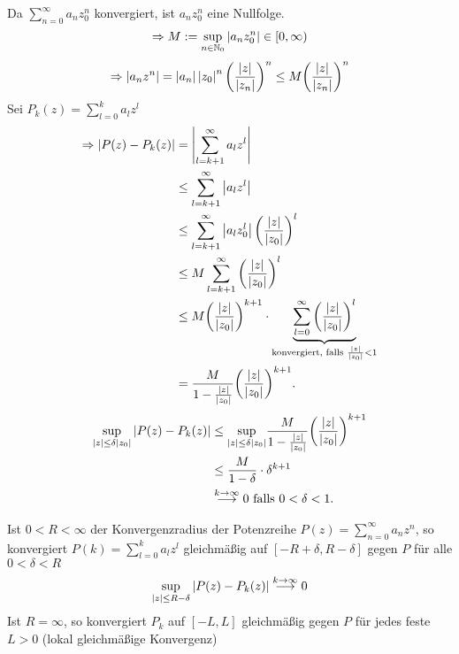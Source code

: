 \documentclass[../ana1.tex]{subfiles}
\begin{document}
\begin{bew}
    Da \( \sum_{n=0}^\infty a_n z_0^n \) konvergiert, ist 
    \( a_n z_0^n \) eine Nullfolge.
    \[ \Rightarrow M := \underset{n\in\mathbb{N}_0}{\sup} 
    \left|a_n z_0^n\right| \in [0,\infty) \]
    \[ \Rightarrow \left|a_n z^n\right| = \left|a_n\right| \left|z_0\right|^n 
    {\left(\frac{\left|z\right|}{\left|z_n\right|}\right)}^n 
    \leq M {\left(\frac{\left|z\right|}{\left|z_n\right|}\right)}^n \]
    Sei \( P_k(z) = \sum_{l=0}^k a_l z^l \)
    \begin{align*}
        \Rightarrow \left| P(z) - P_k(z) \right| 
        &= \left| \sum_{l=k+1}^\infty a_l z^l \right| \\
        &\leq \sum_{l=k+1}^\infty \left|a_l z^l\right| \\
        &\leq \sum_{l=k+1}^\infty \left| a_l z_0^l \right| 
        {\left( \frac{\left|z\right|}{\left|z_0\right|} \right)}^l \\
        &\leq M \sum_{l=k+1}^\infty 
        {\left( \frac{\left|z\right|}{\left|z_0\right|} \right)}^l \\
        &\leq M {\left( \frac{\left|z\right|}{\left|z_0\right|} \right)}^{k+1} 
        \cdot \underbrace{\sum_{l=0}^\infty 
        {\left( \frac{\left|z\right|}{\left|z_0\right|} \right)}^l}_{
            \text{konvergiert, falls } \frac{\left|z\right|}{\left|z_0\right|} < 1
        }\\
        &= \frac{ M }{ 1-\frac{\left|z\right|}{\left|z_0\right|} } 
        {\left( \frac{\left|z\right|}{\left|z_0\right|} \right)}^{k+1}.
    \end{align*}
    \begin{align*}
        \underset{\left|z\right| \leq \delta \left|z_0\right|}{\sup} 
        \left|P(z) - P_k(z)\right| 
        &\leq \underset{\left|z\right| \leq \delta \left|z_0\right|}{\sup} 
        \frac{ M }{ 1 - \frac{\left|z\right|}{\left|z_0\right|} } 
        {\left( \frac{\left|z\right|}{\left|z_0\right|} \right)}^{k+1}\\
        &\leq \frac{M}{1-\delta} \cdot \delta^{k+1}\\
        &\overset{k\rightarrow\infty}{\longrightarrow} 0 
        \text{ falls } 0 < \delta < 1.
    \end{align*}
\end{bew}
\begin{bem}
    Ist \(0 < R < \infty \) der Konvergenzradius der Potenzreihe 
    \(P(z) = \sum_{n=0}^{\infty} a_n z^n \), so konvergiert
    \(P(k) = \sum_{l=0}^{k} a_l z^l \) gleichmäßig auf
    \([-R + \delta, R - \delta] \) gegen \( P \) für alle 
    \( 0 < \delta < R \)
    \[ \underset{\left|z\right| \leq R-\delta}{\sup} \left|P(z)-P_k(z)\right|
    \overset{k \rightarrow \infty}{\longrightarrow} 0 \]
    Ist \( R = \infty \), so konvergiert \( P_k \) auf 
    \( [-L,L] \) gleichmäßig gegen \( P \) für jedes feste
    \( L > 0 \) (lokal gleichmäßige Konvergenz)
\end{bem}
\end{document}

